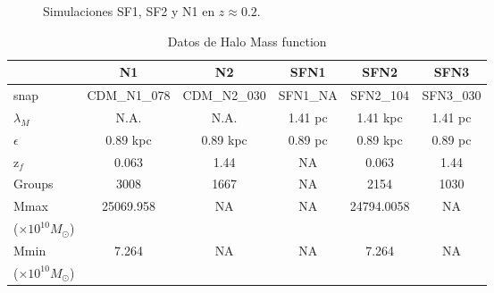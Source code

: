 \documentclass[a4paper,openright,12pt]{book}
\begin{document}
\begin{table}[]
\begin{tabular}{llccccccl}
\end{tabular}
\end{table}

\begin{figure}
\centering
{}
\caption{\footnotesize{Simulaciones SF1, SF2 y N1 en $z\approx0.2$.}}\label{Fig 4.10}
\end{figure}

\begin{table}\footnotesize
\caption{Datos de Halo Mass function}
\label{Tabla 4.6}\centering%
\begin{tabular}{lccccc}
\toprule%
&N1&N2&SFN1&SFN2&SFN3 \\\toprule%
\textsf{snap}&CDM\_{N1}\_{078}&CDM\_{N2}\_{030}&SFN1\_{NA}&SFN2\_{104}&SFN3\_{030} \\
$\lambda_{M}$&N.A.&N.A.&1.41 pc&1.41 kpc& 1.41 pc\\
$\epsilon$&0.89 kpc&0.89 kpc& 0.89 pc&0.89 kpc&0.89 pc\\
\textsf{z$_{f}$}&0.063&1.44&NA&0.063&1.44\\
\textsf{Groups}&3008&1667&NA&2154&1030\\
\textsf{Mmax}&25069.958&NA&NA&24794.0058&NA\\
($\times10^{10}M_\odot$)\\
\textsf{Mmin}&7.264&NA&NA&7.264&NA\\
($\times10^{10}M_\odot$)\\\bottomrule
\end{tabular}
\end{table} 
\end{document}
